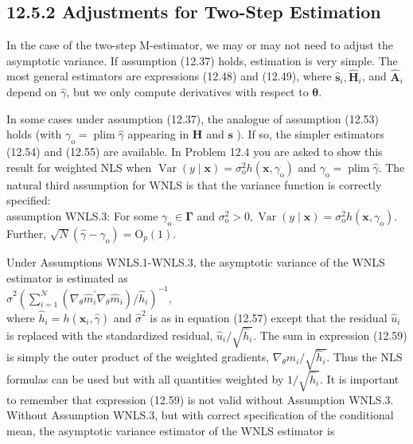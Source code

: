 \documentclass[10pt]{article}
\begin{document}
\subsection*{12.5.2 Adjustments for Two-Step Estimation}
In the case of the two-step M-estimator, we may or may not need to adjust the asymptotic variance. If assumption (12.37) holds, estimation is very simple. The most general estimators are expressions (12.48) and (12.49), where $\hat{\mathbf{s}}_{i}, \hat{\mathbf{H}}_{i}$, and $\hat{\mathbf{A}}_{i}$ depend on $\hat{\gamma}$, but we only compute derivatives with respect to $\boldsymbol{\theta}$.

In some cases under assumption (12.37), the analogue of assumption (12.53) holds (with $\gamma_{\mathrm{o}}=\operatorname{plim} \hat{\gamma}$ appearing in $\mathbf{H}$ and $\mathbf{s}$ ). If so, the simpler estimators (12.54) and (12.55) are available. In Problem 12.4 you are asked to show this result for weighted NLS when $\operatorname{Var}(y \mid \mathbf{x})=\sigma_{\mathrm{o}}^{2} h\left(\mathbf{x}, \gamma_{\mathrm{o}}\right)$ and $\gamma_{\mathrm{o}}=\operatorname{plim} \hat{\gamma}$. The natural third assumption for WNLS is that the variance function is correctly specified:\\
assumption WNLS.3: For some $\gamma_{\mathrm{o}} \in \boldsymbol{\Gamma}$ and $\sigma_{\mathrm{o}}^{2}>0, \operatorname{Var}(y \mid \mathbf{x})=\sigma_{\mathrm{o}}^{2} h\left(\mathbf{x}, \gamma_{\mathrm{o}}\right)$. Further, $\sqrt{N}\left(\hat{\gamma}-\gamma_{\mathrm{o}}\right)=\mathrm{O}_{p}(1)$.

Under Assumptions WNLS.1-WNLS.3, the asymptotic variance of the WNLS estimator is estimated as\\
$\hat{\sigma}^{2}\left(\sum_{i=1}^{N}\left(\nabla_{\theta} \hat{m}_{i}^{\prime} \nabla_{\theta} \hat{m}_{i}\right) / \hat{h}_{i}\right)^{-1}$,\\
where $\hat{h}_{i}=h\left(\mathbf{x}_{i}, \hat{\gamma}\right)$ and $\hat{\sigma}^{2}$ is as in equation (12.57) except that the residual $\hat{u}_{i}$ is replaced with the standardized residual, $\hat{u}_{i} / \sqrt{\hat{h}_{i}}$. The sum in expression (12.59) is simply the outer product of the weighted gradients, $\nabla_{\theta} \hat{m}_{i} / \sqrt{\hat{h}_{i}}$. Thus the NLS formulas can be used but with all quantities weighted by $1 / \sqrt{\hat{h}_{i}}$. It is important to remember that expression (12.59) is not valid without Assumption WNLS.3. Without Assumption WNLS.3, but with correct specification of the conditional mean, the asymptotic variance estimator of the WNLS estimator is
\end{document}
